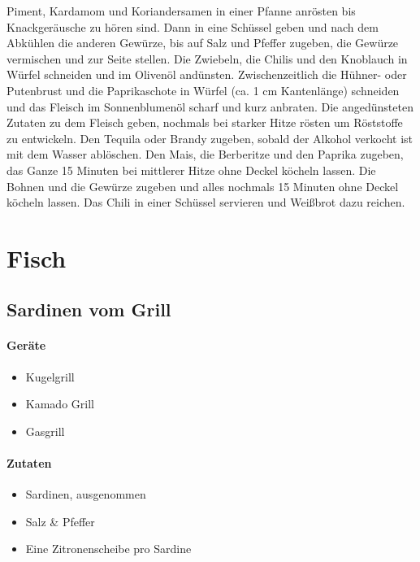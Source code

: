 Piment, Kardamom und Koriandersamen in einer Pfanne anrösten bis Knackgeräusche zu hören sind. Dann in eine Schüssel geben und nach dem Abkühlen die anderen Gewürze, bis auf Salz und Pfeffer zugeben, die Gewürze vermischen und zur Seite stellen.
Die Zwiebeln, die Chilis und den Knoblauch in Würfel schneiden und im Olivenöl andünsten. Zwischenzeitlich die Hühner- oder Putenbrust und die Paprikaschote in Würfel (ca. 1 cm Kantenlänge) schneiden und das Fleisch im Sonnenblumenöl scharf und kurz anbraten.
Die angedünsteten Zutaten zu dem Fleisch geben, nochmals bei starker Hitze rösten um Röststoffe zu entwickeln. Den Tequila oder Brandy zugeben, sobald der Alkohol verkocht ist mit dem Wasser ablöschen. Den Mais, die Berberitze  und den Paprika zugeben, das Ganze 15 Minuten bei mittlerer Hitze ohne Deckel köcheln lassen.  
Die Bohnen und die Gewürze zugeben und alles nochmals 15 Minuten ohne Deckel köcheln lassen.
Das Chili in einer Schüssel servieren und Weißbrot dazu reichen.


\section{Fisch}

\subsection{Sardinen vom Grill}

\paragraph{Geräte}

\begin{itemize}[noitemsep]
	\item Kugelgrill
	\item Kamado Grill
	\item Gasgrill
\end{itemize}

\paragraph{Zutaten}

\begin{itemize}[noitemsep]
	\item Sardinen, ausgenommen
	\item Salz \& Pfeffer
	\item Eine Zitronenscheibe pro Sardine
\end{itemize}

